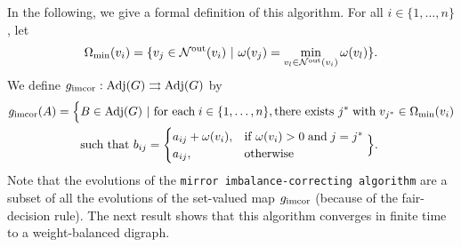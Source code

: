 \documentclass[final]{siamltex}
\begin{document}
In the following, we give a formal definition of this algorithm. 
For all $ i\in\{1,\ldots, n\} $, let
\[
{{\Omega}_{\textup{{min}}}}(v_i)=\{v_j \in {{\mathcal{N}}^{\textup{{out}}}}(v_i) \ | \
\omega(v_j)=\min_{v_l\in {{\mathcal{N}}^{\textup{{out}}}}(v_i)} \omega(v_l)\}.
\]
We define $ {{g}_{\textup{{imcor}}}}: {\operatorname{Adj}}(G) \rightrightarrows {\operatorname{Adj}}(G) $
by
\begin{align}\label{eq:g}
  {{g}_{\textup{{imcor}}}}(A)&= \Big\{ B\in {\operatorname{Adj}}(G) \ | \ \text{for each} \;
  i \in \{1,\ldots, n\}, \text{there exists } j^* \; \mathrm{with} \;
  v_{j^*} \in {{\Omega}_{\textup{{min}}}}(v_i) \nonumber
  \\
  & \qquad \text{such that } b_{ij}=
  \begin{cases}
    a_{ij}+\omega(v_i), & \mathrm{if} \; \omega(v_i)>0 \;
    \text{and} \; j =j^*
    \\
    a_{ij}, & \mathrm{otherwise}
  \end{cases}
  \Big\}.
\end{align}
Note that the evolutions of the {\texttt{mirror imbalance-correcting
    algorithm}\xspace} are a subset of all the
evolutions of the set-valued map $ {{g}_{\textup{{imcor}}}}$ (because of the
fair-decision rule). The next result shows that this algorithm
converges in finite time to a weight-balanced digraph. 
\end{document}
